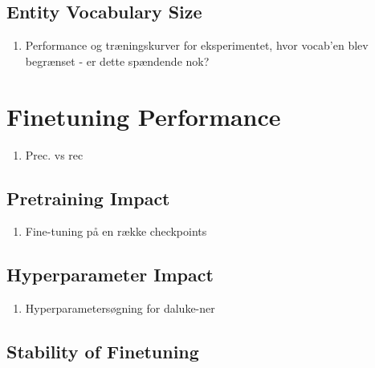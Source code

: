 \documentclass[main.tex]{subfiles}
\begin{document}
\subsection{Entity Vocabulary Size}

\begin{enumerate}
    \item Performance og træningskurver for eksperimentet, hvor vocab'en blev begrænset - er dette spændende nok?
\end{enumerate}

\section{Finetuning Performance}
\begin{enumerate}
    \item Prec. vs rec
\end{enumerate}

\subsection{Pretraining Impact}
\begin{enumerate}
    \item Fine-tuning på en række checkpoints
\end{enumerate}

\subsection{Hyperparameter Impact}

\begin{enumerate}
    \item Hyperparametersøgning for daluke-ner
\end{enumerate}

\subsection{Stability of Finetuning}
\end{document}
